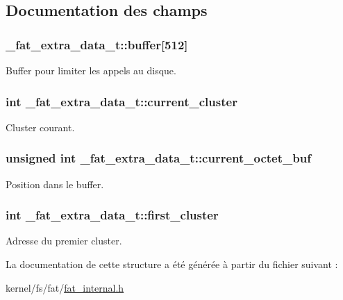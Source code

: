 \subsection{Documentation des champs}
\hypertarget{struct__fat__extra__data__t_a74dd347d769bd4aefdf0ad1207be6798}{
\subsubsection[{buffer}]{ \-\_\-fat\-\_\-extra\-\_\-data\-\_\-t\-::buffer\mbox{[}512\mbox{]}}}\label{struct__fat__extra__data__t_a74dd347d769bd4aefdf0ad1207be6798}
Buffer pour limiter les appels au disque. \hypertarget{struct__fat__extra__data__t_a0708cae473b2962cfa6c10f50d9b008b}{
\subsubsection[{current\-\_\-cluster}]{\setlength{\rightskip}{0pt plus 5cm}int \-\_\-fat\-\_\-extra\-\_\-data\-\_\-t\-::current\-\_\-cluster}}\label{struct__fat__extra__data__t_a0708cae473b2962cfa6c10f50d9b008b}
Cluster courant. \hypertarget{struct__fat__extra__data__t_a38be57e802b36532ce01e46d7be7da44}{
\subsubsection[{current\-\_\-octet\-\_\-buf}]{\setlength{\rightskip}{0pt plus 5cm}unsigned int \-\_\-fat\-\_\-extra\-\_\-data\-\_\-t\-::current\-\_\-octet\-\_\-buf}}\label{struct__fat__extra__data__t_a38be57e802b36532ce01e46d7be7da44}
Position dans le buffer. \hypertarget{struct__fat__extra__data__t_a5cc9910b0f971c600d2d4a52290509fa}{
\subsubsection[{first\-\_\-cluster}]{\setlength{\rightskip}{0pt plus 5cm}int \-\_\-fat\-\_\-extra\-\_\-data\-\_\-t\-::first\-\_\-cluster}}\label{struct__fat__extra__data__t_a5cc9910b0f971c600d2d4a52290509fa}
Adresse du premier cluster. 

La documentation de cette structure a été générée à partir du fichier suivant \-:\begin{DoxyCompactItemize}
\item 
kernel/fs/fat/\hyperlink{fat__internal_8h}{fat\-\_\-internal.\-h}\end{DoxyCompactItemize}
